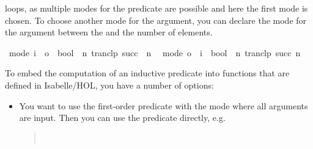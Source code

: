 \begin{isabellebody}
\begin{isamarkuptext}
   loops, as multiple modes for the
  predicate  are possible and here the first mode  is chosen. To choose another mode for the argument,
  you can declare the mode for the argument between the \hyperlink{command.values}{\mbox{}} and the number of elements.%
\end{isamarkuptext}%
\isamarkuptrue%
%
\isadelimquote
%
\endisadelimquote
%
\isatagquote
{}\isamarkupfalse%
\ {}mode{}\ i\ {}\ o\ {}\ bool{}\ {}\ {}{}n{}\ tranclp\ succ\ {}{}\ n{}{}\ \isanewline
{}\isamarkupfalse%
\ {}mode{}\ o\ {}\ i\ {}\ bool{}\ {}\ {}{}n{}\ tranclp\ succ\ n\ {}{}{}{}%
\endisatagquote
{\isafoldquote}%
%
\isadelimquote
%
\endisadelimquote
%
\isamarkuptrue%
%
\begin{isamarkuptext}%
To embed the computation of an inductive predicate into functions
  that are defined in Isabelle/HOL, you have a number of options:

  \begin{itemize}

    \item You want to use the first-order predicate with the mode
      where all arguments are input. Then you can use the predicate directly, e.g.

      \begin{quote}
         \\
      \end{quote}


\end{itemize}
\end{isamarkuptext}
\end{isabellebody}
